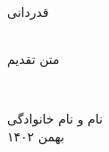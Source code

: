 \begin{center}
	{\LARGE قدردانی}\\
	\hfill\\
\end{center}
متن تقدیم
	
\hfill\\
\begin{flushleft}
	نام و نام خانوادگی\\
	بهمن ۱۴۰۲
\end{flushleft}
